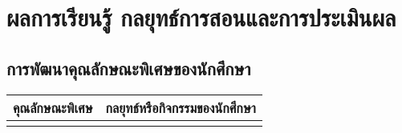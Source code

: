 
\chapter{ผลการเรียนรู้ กลยุทธ์การสอนและการประเมินผล}

\section{การพัฒนาคุณลักษณะพิเศษของนักศึกษา}

\renewcommand{\arraystretch}{1.2}
\begin{tabular}{|p{}|p{}|}
\hline
\textbf{คุณลักษณะพิเศษ} & \textbf{กลยุทธ์หรือกิจกรรมของนักศึกษา} \\ 
\hline	

 & \\
 \hline
 
\end{tabular}

